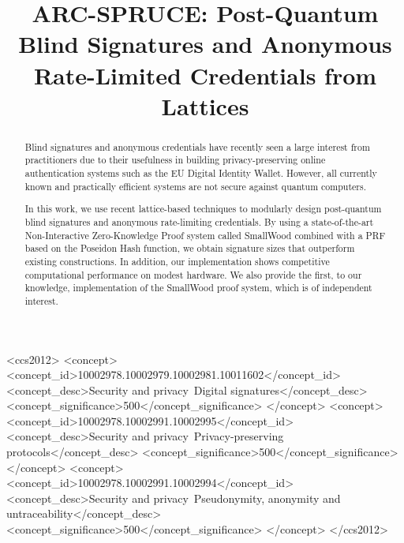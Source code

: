 \documentclass[sigconf]{acmart}
\begin{document}
\title{ARC-SPRUCE: Post-Quantum Blind Signatures and  Anonymous Rate-Limited Credentials from Lattices}

\begin{CCSXML}
<ccs2012>
<concept>
<concept_id>10002978.10002979.10002981.10011602</concept_id>
<concept_desc>Security and privacy~Digital signatures</concept_desc>
<concept_significance>500</concept_significance>
</concept>
<concept>
<concept_id>10002978.10002991.10002995</concept_id>
<concept_desc>Security and privacy~Privacy-preserving protocols</concept_desc>
<concept_significance>500</concept_significance>
</concept>
<concept>
<concept_id>10002978.10002991.10002994</concept_id>
<concept_desc>Security and privacy~Pseudonymity, anonymity and untraceability</concept_desc>
<concept_significance>500</concept_significance>
</concept>
</ccs2012>
\end{CCSXML}




\begin{abstract}
Blind signatures and anonymous credentials have recently seen a large interest from practitioners due to their usefulness in building privacy-preserving online authentication systems such as the EU Digital Identity Wallet. However, all currently known and practically efficient systems are not secure against quantum computers.

In this work, we use recent lattice-based techniques to modularly design post-quantum blind signatures and anonymous rate-limiting credentials. By using a state-of-the-art Non-Interactive Zero-Knowledge Proof system called SmallWood combined with a PRF based on the Poseidon Hash function, we obtain signature sizes that outperform existing constructions. In addition, our implementation shows competitive computational performance on modest hardware. We also provide the first, to our knowledge, implementation of the SmallWood proof system, which is of independent interest.
\end{abstract}
\end{document}
